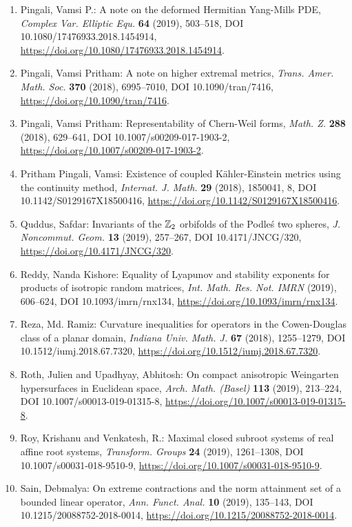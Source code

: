\begin{enumerate}
\item Pingali, Vamsi P.: A note on the deformed {H}ermitian {Y}ang-{M}ills {PDE}, \emph{Complex Var. Elliptic Equ.} {\bf 64} (2019), 503--518, DOI 10.1080/17476933.2018.1454914, \url{https://doi.org/10.1080/17476933.2018.1454914}.
\item Pingali, Vamsi Pritham: A note on higher extremal metrics, \emph{Trans. Amer. Math. Soc.} {\bf 370} (2018), 6995--7010, DOI 10.1090/tran/7416, \url{https://doi.org/10.1090/tran/7416}.
\item Pingali, Vamsi Pritham: Representability of {C}hern-{W}eil forms, \emph{Math. Z.} {\bf 288} (2018), 629--641, DOI 10.1007/s00209-017-1903-2, \url{https://doi.org/10.1007/s00209-017-1903-2}.
\item Pritham Pingali, Vamsi: Existence of coupled {K}\"{a}hler-{E}instein metrics using the
continuity method, \emph{Internat. J. Math.} {\bf 29} (2018), 1850041, 8, DOI 10.1142/S0129167X18500416, \url{https://doi.org/10.1142/S0129167X18500416}.
\item Quddus, Safdar: Invariants of the {$\Bbb Z_2$} orbifolds of the {P}odle\'{s} two
spheres, \emph{J. Noncommut. Geom.} {\bf 13} (2019), 257--267, DOI 10.4171/JNCG/320, \url{https://doi.org/10.4171/JNCG/320}.
\item Reddy, Nanda Kishore: Equality of {L}yapunov and stability exponents for products of
isotropic random matrices, \emph{Int. Math. Res. Not. IMRN} {\bf } (2019), 606--624, DOI 10.1093/imrn/rnx134, \url{https://doi.org/10.1093/imrn/rnx134}.
\item Reza, Md. Ramiz: Curvature inequalities for operators in the {C}owen-{D}ouglas
class of a planar domain, \emph{Indiana Univ. Math. J.} {\bf 67} (2018), 1255--1279, DOI 10.1512/iumj.2018.67.7320, \url{https://doi.org/10.1512/iumj.2018.67.7320}.
\item Roth, Julien and Upadhyay, Abhitosh: On compact anisotropic {W}eingarten hypersurfaces in
{E}uclidean space, \emph{Arch. Math. (Basel)} {\bf 113} (2019), 213--224, DOI 10.1007/s00013-019-01315-8, \url{https://doi.org/10.1007/s00013-019-01315-8}.
\item Roy, Krishanu and Venkatesh, R.: Maximal closed subroot systems of real affine root systems, \emph{Transform. Groups} {\bf 24} (2019), 1261--1308, DOI 10.1007/s00031-018-9510-9, \url{https://doi.org/10.1007/s00031-018-9510-9}.
\item Sain, Debmalya: On extreme contractions and the norm attainment set of a
bounded linear operator, \emph{Ann. Funct. Anal.} {\bf 10} (2019), 135--143, DOI 10.1215/20088752-2018-0014, \url{https://doi.org/10.1215/20088752-2018-0014}.

\end{enumerate}
